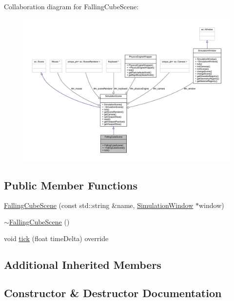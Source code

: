 Collaboration diagram for Falling\+Cube\+Scene\+:\nopagebreak
\begin{figure}[H]
\begin{center}
\leavevmode
\includegraphics[width=350pt]{class_falling_cube_scene__coll__graph}
\end{center}
\end{figure}
\subsection*{Public Member Functions}
\begin{DoxyCompactItemize}
\item 
\mbox{\hyperlink{class_falling_cube_scene_ab65845f492b9ba6923ca300a426d94c6}{Falling\+Cube\+Scene}} (const std\+::string \&name, \mbox{\hyperlink{class_simulation_window}{Simulation\+Window}} $\ast$window)
\item 
\mbox{\hyperlink{class_falling_cube_scene_a36bf17afa0db6cbf678fa2b1741c2e67}{$\sim$\+Falling\+Cube\+Scene}} ()
\item 
void \mbox{\hyperlink{class_falling_cube_scene_a4d077fc6767b5f5017a35d0433929c27}{tick}} (float time\+Delta) override
\end{DoxyCompactItemize}
\subsection*{Additional Inherited Members}


\subsection{Constructor \& Destructor Documentation}
\mbox{\label{class_falling_cube_scene_ab65845f492b9ba6923ca300a426d94c6}} 
